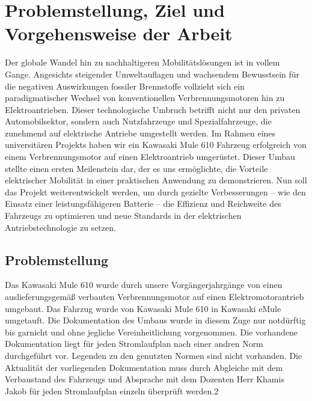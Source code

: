 \chapter{Problemstellung, Ziel und Vorgehensweise der Arbeit}
\label{cha:Problemstellung, Ziel und Vorgehensweise der Arbeit}

Der globale Wandel hin zu nachhaltigeren Mobilitätslösungen ist in vollem Gange. Angesichts steigender Umweltauflagen und wachsendem Bewusstsein für die negativen Auswirkungen fossiler Brennstoffe vollzieht sich ein paradigmatischer Wechsel von konventionellen Verbrennungsmotoren hin zu Elektroantrieben. Dieser technologische Umbruch betrifft nicht nur den privaten Automobilsektor, sondern auch Nutzfahrzeuge und Spezialfahrzeuge, die zunehmend auf elektrische Antriebe umgestellt werden.\autocite{Pischinger2023}
Im Rahmen eines universitären Projekts haben wir ein Kawasaki Mule 610 Fahrzeug erfolgreich von einem Verbrennungsmotor auf einen Elektroantrieb umgerüstet. Dieser Umbau stellte einen ersten Meilenstein dar, der es uns ermöglichte, die Vorteile elektrischer Mobilität in einer praktischen Anwendung zu demonstrieren. Nun soll das Projekt weiterentwickelt werden, um durch gezielte Verbesserungen – wie den Einsatz einer leistungsfähigeren Batterie – die Effizienz und Reichweite des Fahrzeugs zu optimieren und neue Standards in der elektrischen Antriebstechnologie zu setzen.

\section*{Problemstellung}
Das Kawasaki Mule 610 wurde durch unsere Vorgängerjahrgänge von einen auslieferungsgemäß verbauten Verbrennungsmotor auf einen Elektromotorantrieb umgebaut. Das Fahrzug wurde von \glqq Kawasaki Mule 610 \grqq in \glqq Kawasaki eMule \grqq umgetauft. Die Dokumentation des Umbaus wurde in diesem Zuge nur notdürftig bis garnicht und ohne jegliche Vereinheitlichung vorgenommen. Die vorhandene Dokumentation liegt für jeden Stromlaufplan nach einer andren Norm durchgeführt vor. Legenden zu den genutzten Normen sind nicht vorhanden. Die Aktualität der vorliegenden Dokumentation muss durch Abgleiche mit dem Verbaustand des Fahrzeugs und Absprache mit dem Dozenten Herr Khamis Jakob für jeden Stromlaufplan einzeln überprüft werden.2  


